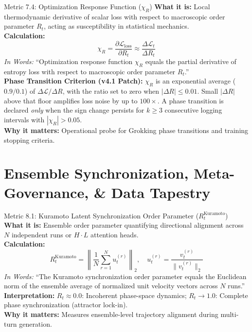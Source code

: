 \documentclass[11pt,a4paper]{article}
\begin{document}
\begin{metricbox}{Metric 7.4: Optimization Response Function ($\chi_R$)}
\textbf{What it is:} Local thermodynamic derivative of scalar loss with respect to macroscopic order parameter $R_t$, acting as susceptibility in statistical mechanics.\\
\textbf{Calculation:}
 $$\chi_R = \frac{\partial \mathcal{L}_{\text{loss}}}{\partial R_t} \approx \frac{\Delta \mathcal{L}_t}{\Delta R_t}$$ \emph{In Words:} ``Optimization response function $\chi_R$ equals the partial derivative of entropy loss with respect to macroscopic order parameter $R_t$.''\\
\textbf{Phase Transition Criterion (v4.1 Patch):} $\chi_R$ is an exponential average ($0.9/0.1$) of $\Delta\mathcal{L}/\Delta R$, with the ratio set to zero when $|\Delta R| \le 0.01$. Small $|\Delta R|$ above that floor amplifies loss noise by up to $100\times$. A phase transition is declared \emph{only} when the sign change persists for $k \ge 3$ consecutive logging intervals with $|\chi_R| > 0.05$.\\
\textbf{Why it matters:} Operational probe for Grokking phase transitions and training stopping criteria.
\end{metricbox}

\section{Ensemble Synchronization, Meta-Governance, \& Data Tapestry}

\begin{metricbox}{Metric 8.1: Kuramoto Latent Synchronization Order Parameter ($R_t^{\text{Kuramoto}}$)}
\textbf{What it is:} Ensemble order parameter quantifying directional alignment across $N$ independent runs or $H \cdot L$ attention heads.\\
\textbf{Calculation:}
 $$R_t^{\text{Kuramoto}} = \left\|\frac{1}{N} \sum_{r=1}^N u_t^{(r)}\right\|_2, \quad u_t^{(r)} = \frac{v_t^{(r)}}{\|v_t^{(r)}\|_2}$$ \emph{In Words:} ``The Kuramoto synchronization order parameter equals the Euclidean norm of the ensemble average of normalized unit velocity vectors across $N$ runs.''\\
\textbf{Interpretation:} $R_t \approx 0.0$: Incoherent phase-space dynamics; $R_t \to 1.0$: Complete phase synchronization (attractor lock-in).\\
\textbf{Why it matters:} Measures ensemble-level trajectory alignment during multi-turn generation.
\end{metricbox}
\end{document}
